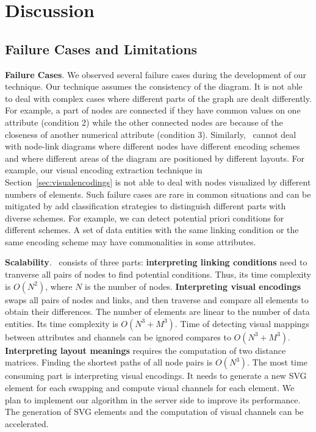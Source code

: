 \section{Discussion}


\subsection{Failure Cases and Limitations}
\textbf{Failure Cases}.
We observed several failure cases during the development of our technique.
Our technique assumes the consistency of the diagram.
It is not able to deal with complex cases where different parts of the graph are dealt differently.
For example, a part of nodes are connected if they have common values on one attribute (condition 2) while the other connected nodes are because of the closeness of another numerical attribute (condition 3).
Similarly, \ApproachName~cannot deal with node-link diagrams where different nodes have different encoding schemes and where different areas of the diagram are positioned by different layouts.
For example, our visual encoding extraction technique in Section~\ref{sec:visualencodings} is not able to deal with nodes visualized by different numbers of elements.
Such failure cases are rare in common situations and can be mitigated by add classification strategies to distinguish different parts with diverse schemes.
For example, we can detect potential priori conditions for different schemes.
A set of data entities with the same linking condition or the same encoding scheme may have commonalities in some attributes.

\textbf{Scalability}.
\ApproachName~consists of three parts:
\textbf{interpreting linking conditions} need to tranverse all pairs of nodes to find potential conditions.
Thus, its time complexity is $O(N^2)$, where $N$ is the number of nodes.
\textbf{Interpreting visual encodings} swaps all pairs of nodes and links, and then traverse and compare all elements to obtain their differences.
The number of elements are linear to the number of data entities.
Its time complexity is $O(N^3 + M^3)$.
Time of detecting visual mappings between attributes and channels can be ignored compares to $O(N^3 + M^3)$.
\textbf{Interpreting layout meanings} requires the computation of two distance matrices.
Finding the shortest paths of all node pairs is $O(N^3)$.
The most time consuming part is interpreting visual encodings.
It needs to generate a new SVG element for each swapping and compute visual channels for each element.
We plan to implement our algorithm in the server side to improve its performance.
The generation of SVG elements and the computation of visual channels can be accelerated.